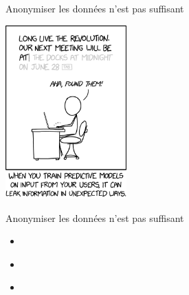 \documentclass[10pt,serif]{beamer}
\begin{document}
  \begin{frame}{Anonymiser les données n'est pas suffisant}
    \begin{center}
      \includegraphics[width=0.35\textwidth, clip]{"./proofs/figures/predictive_models.png"}\\
    \end{center}
  \end{frame}

  \begin{frame}{Anonymiser les données n'est pas suffisant}
    \begin{itemize}
      \item<1->\\

      \item<2->\\
      
      \item<3->
    \end{itemize}

  \end{frame}
\end{document}
